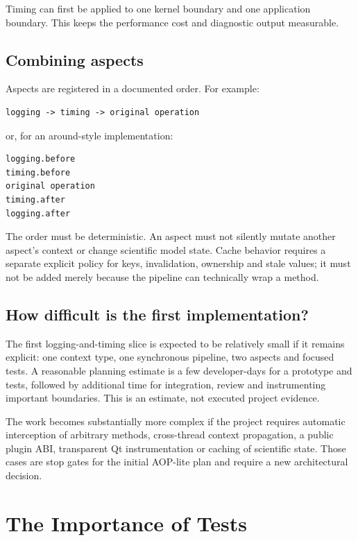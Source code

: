 Timing can first be applied to one kernel boundary and one application
boundary. This keeps the performance cost and diagnostic output measurable.

\subsection{Combining aspects}

Aspects are registered in a documented order. For example:

\begin{verbatim}
logging -> timing -> original operation
\end{verbatim}

or, for an around-style implementation:

\begin{verbatim}
logging.before
timing.before
original operation
timing.after
logging.after
\end{verbatim}

The order must be deterministic. An aspect must not silently mutate another
aspect's context or change scientific model state. Cache behavior requires a
separate explicit policy for keys, invalidation, ownership and stale values;
it must not be added merely because the pipeline can technically wrap a
method.

\subsection{How difficult is the first implementation?}

The first logging-and-timing slice is expected to be relatively small if it
remains explicit: one context type, one synchronous pipeline, two aspects and
focused tests. A reasonable planning estimate is a few developer-days for a
prototype and tests, followed by additional time for integration, review and
instrumenting important boundaries. This is an estimate, not executed project
evidence.

The work becomes substantially more complex if the project requires automatic
interception of arbitrary methods, cross-thread context propagation, a public
plugin ABI, transparent Qt instrumentation or caching of scientific state.
Those cases are stop gates for the initial AOP-lite plan and require a new
architectural decision.

\section{The Importance of Tests}
\label{sec:cap10_importancia_dos_testes}


